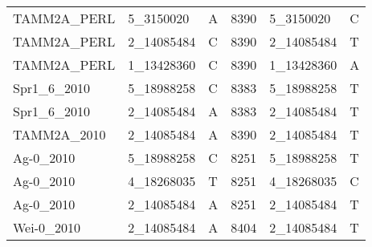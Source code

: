 \begin{center}
\begin{longtable}{|l|l|l|l|l|l|}
TAMM2A\_PERL&5\_3150020&A&8390&5\_3150020&C\\
TAMM2A\_PERL&2\_14085484&C&8390&2\_14085484&T\\
TAMM2A\_PERL&1\_13428360&C&8390&1\_13428360&A\\
Spr1\_6\_2010&5\_18988258&C&8383&5\_18988258&T\\
Spr1\_6\_2010&2\_14085484&A&8383&2\_14085484&T\\
TAMM2A\_2010&2\_14085484&A&8390&2\_14085484&T\\
Ag-0\_2010&5\_18988258&C&8251&5\_18988258&T\\
Ag-0\_2010&4\_18268035&T&8251&4\_18268035&C\\
Ag-0\_2010&2\_14085484&A&8251&2\_14085484&T\\
Wei-0\_2010&2\_14085484&A&8404&2\_14085484&T\\
\hline
\end{longtable}
\end{center}

